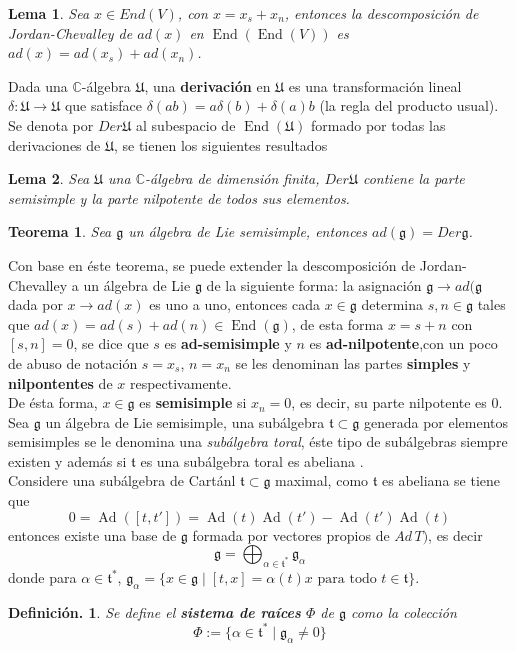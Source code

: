 \documentclass[11pt,a4paper]{article}
\newtheorem{definition}{Definici\'on.}
\newtheorem{theorem}{Teorema}
\newtheorem{lemma}{Lema}
\newcommand{\Ad}{\operatorname{Ad}}
\newcommand{\mfF}{\mathfrak{U}}
\newcommand{\suchthat}{\mid}
\newcommand{\End}{\mathop{End}}
\begin{document}
\begin{lemma}
Sea $x\in End(V)$, con $x=x_s+x_n$, entonces la descomposición de Jordan-Chevalley de $ad(x)$ en $\End(\End(V))$ es $ad(x)=ad(x_s)+ad(x_n)$. 
\end{lemma}
Dada una $\mathbb{C}$-álgebra $\mathfrak{U}$, una \textbf{derivación} en $\mathfrak{U}$ es una transformación lineal $\delta: \mathfrak{U}\rightarrow \mathfrak{U}$ que satisface $\delta(ab)= a\delta(b)+ \delta(a) b$ (la regla del producto usual). Se denota por $Der\mathfrak{U}$ al subespacio de $\End(\mathfrak{U})$ formado por todas las derivaciones de $\mathfrak{U}$, se tienen los siguientes resultados
\begin{lemma}
Sea $\mfF$ una $\mathbb{C}$-álgebra de dimensión finita, $Der\mathfrak{U}$ contiene la parte semisimple y la parte nilpotente de todos sus elementos.
\end{lemma}
\begin{theorem}
Sea $\mathfrak{g}$ un álgebra de Lie semisimple, entonces $ad(\mathfrak{g})=Der\mathfrak{g} $.
\end{theorem}
Con base en éste teorema, se puede extender la descomposición de Jordan-Chevalley a un álgebra de Lie $\mathfrak{g}$ de la siguiente forma: la asignación $\mathfrak{g}\rightarrow ad(\mathfrak{g}$ dada por $x\rightarrow ad(x)$ es uno a uno, entonces cada $x\in \mathfrak{g}$ determina $s,n\in \mathfrak{g}$ tales que $ad(x)=ad(s) +  ad(n) \in \End(\mathfrak{g})$, de esta forma $x=s+n$ con $[s,n]=0$, se dice que $s$ es \textbf{ad-semisimple} y $n$ es \textbf{ad-nilpotente},con un poco de abuso de notación $s=x_s$, $n=x_n$ se les denominan las partes \textbf{simples} y \textbf{nilpontentes} de $x$ respectivamente. \\

De ésta forma, $x\in \mathfrak{g}$ es \textbf{semisimple} si $x_n=0$, es decir, su parte nilpotente es $0$.\\

Sea $\mathfrak{g}$ un álgebra de Lie semisimple, una subálgebra $\mathfrak{t}\subset \mathfrak{g}$ generada por elementos semisimples se le denomina una \textit{subálgebra toral}, éste tipo de subálgebras siempre existen y además si $\mathfrak{t}$ es una subálgebra toral es abeliana \citep{humphreys2012introduction}. \\
Considere una subálgebra de Cartánl $\mathfrak{t}\subset \mathfrak{g}$ maximal, como $\mathfrak{t}$ es abeliana se tiene que
$$0= \Ad([t,t'])=\Ad(t)\Ad(t')-\Ad(t')\Ad(t) $$
entonces existe una base  de $\mathfrak{g}$ formada por vectores propios de $Ad \, T)$, es decir
$$ \mathfrak{g}= \bigoplus_{\alpha \in \mathfrak{t}^{*}} \mathfrak{g}_\alpha$$
donde para $\alpha \in \mathfrak{t}^{*}$, $\mathfrak{g}_{\alpha} = \{ x\in \mathfrak{g} \suchthat [t,x]= \alpha(t)x \,\, \mbox{para todo} \, \, t\in \mathfrak{t} \}$.
\begin{definition}
Se define  el \textbf{sistema de raíces} $\Phi$ de $\mathfrak{g}$ como la colección 
$$\Phi:= \{ \alpha \in \mathfrak{t}^{*} \suchthat \mathfrak{g}_{\alpha} \neq 0 \}$$
\end{definition}
\end{document}
